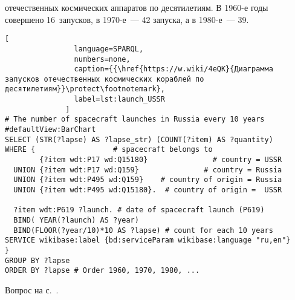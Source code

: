 
\begin{task}
\label{answer:launches_USSR}
 отечественных космических аппаратов по десятилетиям.
    В 1960-е годы совершено 16~запусков, в 1970-е~--- 42 запуска, а в 1980-е~--- 39.%

\begin{lstlisting}[ 
                language=SPARQL, 
                numbers=none, 
                caption={{\href{https://w.wiki/4eQK}{Диаграмма запусков отечественных космических кораблей по десятилетиям}}\protect\footnotemark}, 
                label=lst:launch_USSR
              ]
# The number of spacecraft launches in Russia every 10 years
#defaultView:BarChart
SELECT (STR(?lapse) AS ?lapse_str) (COUNT(?item) AS ?quantity)
WHERE {                  # spacecraft belongs to
        {?item wdt:P17 wd:Q15180}               # country = USSR
  UNION {?item wdt:P17 wd:Q159}               # country = Russia
  UNION {?item wdt:P495 wd:Q159}    # country of origin = Russia
  UNION {?item wdt:P495 wd:Q15180}.  # country of origin =  USSR
  
  ?item wdt:P619 ?launch. # date of spacecraft launch (P619)
  BIND( YEAR(?launch) AS ?year) 
  BIND(FLOOR(?year/10)*10 AS ?lapse) # count for each 10 years
SERVICE wikibase:label {bd:serviceParam wikibase:language "ru,en"}
} 
GROUP BY ?lapse
ORDER BY ?lapse # Order 1960, 1970, 1980, ...
\end{lstlisting}

\small{Вопрос на с.~\pageref{question:spacecraft_1}.}
\end{task}


